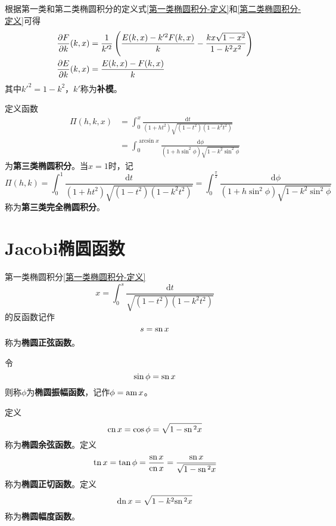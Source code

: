 根据第一类和第二类椭圆积分的定义式\eqref{第一类椭圆积分-定义}和\eqref{第二类椭圆积分-定义}可得
\begin{align}
	\dfrac{\partial F}{\partial k}(k,x) & = \frac{1}{k'^2}\left(\frac{E(k,x)-k'^2F(k,x)}{k}-\frac{kx\sqrt{1-x^2}}{1-k^2x^2}\right) \\
	\dfrac{\partial E}{\partial k}(k,x) & = \frac{E(k,x)-F(k,x)}{k}
\end{align}
其中$k'^2=1-k^2$，$k'$称为{\bf 补模}。

定义函数
\begin{align}
	\varPi(h,k,x) & = \int_0^x \frac{\mathrm{d}t}{(1+ht^2)\sqrt{(1-t^2)(1-k^2t^2)}} \nonumber \\
	& = \int_0^{\arcsin x} \frac{\mathrm{d}\phi}{(1+h\sin^2\phi)\sqrt{1-k^2\sin^2\phi}}
\end{align}
为{\bf 第三类椭圆积分}。当$x=1$时，记
\begin{equation}
	\varPi(h,k) = \int_0^1 \frac{\mathrm{d}t}{(1+ht^2)\sqrt{(1-t^2)(1-k^2t^2)}} = \int_0^{\frac{\pi}{2}} \frac{\mathrm{d}\phi}{(1+h\sin^2\phi)\sqrt{1-k^2\sin^2\phi}}
\end{equation}
称为{\bf 第三类完全椭圆积分}。

\section{Jacobi椭圆函数}

第一类椭圆积分\eqref{第一类椭圆积分-定义}
\begin{equation*}
	x = \int_0^s \frac{\mathrm{d}t}{\sqrt{(1-t^2)(1-k^2t^2)}}
\end{equation*}
的反函数记作
\begin{equation}
	s = \mathrm{sn}\, x
\end{equation}
称为{\bf 椭圆正弦函数}。

令
\begin{equation}
	\sin \phi = \mathrm{sn}\, x
\end{equation}
则称$\phi$为{\bf 椭圆振幅函数}，记作$\phi = \mathrm{am}\, x$。

定义
\begin{equation}
	\mathrm{cn}\, x = \cos \phi = \sqrt{1-\mathrm{sn}\,^2 x}
\end{equation}
称为{\bf 椭圆余弦函数}。定义
\begin{equation}
	\mathrm{tn}\, x = \tan \phi = \frac{\mathrm{sn}\, x}{\mathrm{cn}\, x} = \frac{\mathrm{sn}\, x}{\sqrt{1-\mathrm{sn}\,^2 x}}
\end{equation}
称为{\bf 椭圆正切函数}。定义
\begin{equation}
	\mathrm{dn}\, x = \sqrt{1-k^2\mathrm{sn}\,^2x}
\end{equation}
称为{\bf 椭圆幅度函数}。

